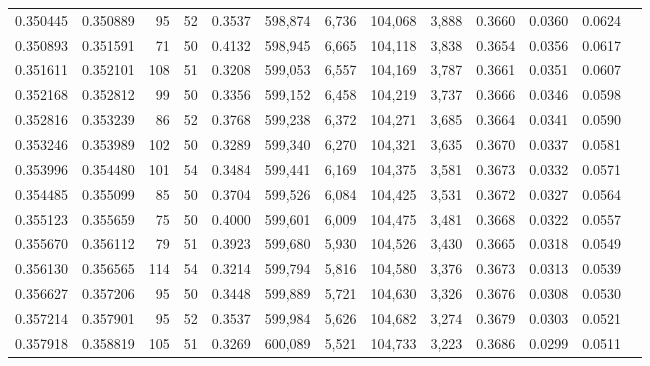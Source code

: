 \begin{tabular}{rrrrrrrrrrrrr}
0.350445 & 0.350889 &    95 &  52 &                                     0.3537 & 598,874 &   6,736 & 104,068 &   3,888 & 0.3660 & 0.0360 & 0.0624 \\
0.350893 & 0.351591 &    71 &  50 &                                     0.4132 & 598,945 &   6,665 & 104,118 &   3,838 & 0.3654 & 0.0356 & 0.0617 \\
0.351611 & 0.352101 &   108 &  51 &                                     0.3208 & 599,053 &   6,557 & 104,169 &   3,787 & 0.3661 & 0.0351 & 0.0607 \\
0.352168 & 0.352812 &    99 &  50 &                                     0.3356 & 599,152 &   6,458 & 104,219 &   3,737 & 0.3666 & 0.0346 & 0.0598 \\
0.352816 & 0.353239 &    86 &  52 &                                     0.3768 & 599,238 &   6,372 & 104,271 &   3,685 & 0.3664 & 0.0341 & 0.0590 \\
0.353246 & 0.353989 &   102 &  50 &                                     0.3289 & 599,340 &   6,270 & 104,321 &   3,635 & 0.3670 & 0.0337 & 0.0581 \\
0.353996 & 0.354480 &   101 &  54 &                                     0.3484 & 599,441 &   6,169 & 104,375 &   3,581 & 0.3673 & 0.0332 & 0.0571 \\
0.354485 & 0.355099 &    85 &  50 &                                     0.3704 & 599,526 &   6,084 & 104,425 &   3,531 & 0.3672 & 0.0327 & 0.0564 \\
0.355123 & 0.355659 &    75 &  50 &                                     0.4000 & 599,601 &   6,009 & 104,475 &   3,481 & 0.3668 & 0.0322 & 0.0557 \\
0.355670 & 0.356112 &    79 &  51 &                                     0.3923 & 599,680 &   5,930 & 104,526 &   3,430 & 0.3665 & 0.0318 & 0.0549 \\
0.356130 & 0.356565 &   114 &  54 &                                     0.3214 & 599,794 &   5,816 & 104,580 &   3,376 & 0.3673 & 0.0313 & 0.0539 \\
0.356627 & 0.357206 &    95 &  50 &                                     0.3448 & 599,889 &   5,721 & 104,630 &   3,326 & 0.3676 & 0.0308 & 0.0530 \\
0.357214 & 0.357901 &    95 &  52 &                                     0.3537 & 599,984 &   5,626 & 104,682 &   3,274 & 0.3679 & 0.0303 & 0.0521 \\
0.357918 & 0.358819 &   105 &  51 &                                     0.3269 & 600,089 &   5,521 & 104,733 &   3,223 & 0.3686 & 0.0299 & 0.0511 \\

\end{tabular}
